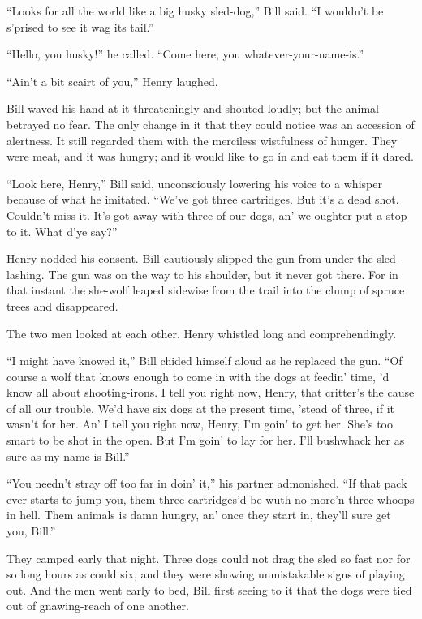 \documentclass[10pt]{book}
\begin{document}
“Looks for all the world like a big husky sled-dog,” Bill said. “I
wouldn’t be s’prised to see it wag its tail.”

“Hello, you husky!” he called. “Come here, you whatever-your-name-is.”

“Ain’t a bit scairt of you,” Henry laughed.

Bill waved his hand at it threateningly and shouted loudly; but the
animal betrayed no fear. The only change in it that they could notice
was an accession of alertness. It still regarded them with the
merciless wistfulness of hunger. They were meat, and it was hungry; and
it would like to go in and eat them if it dared.

“Look here, Henry,” Bill said, unconsciously lowering his voice to a
whisper because of what he imitated. “We’ve got three cartridges. But
it’s a dead shot. Couldn’t miss it. It’s got away with three of our
dogs, an’ we oughter put a stop to it. What d’ye say?”

Henry nodded his consent. Bill cautiously slipped the gun from under
the sled-lashing. The gun was on the way to his shoulder, but it never
got there. For in that instant the she-wolf leaped sidewise from the
trail into the clump of spruce trees and disappeared.

The two men looked at each other. Henry whistled long and
comprehendingly.

“I might have knowed it,” Bill chided himself aloud as he replaced the
gun. “Of course a wolf that knows enough to come in with the dogs at
feedin’ time, ’d know all about shooting-irons. I tell you right now,
Henry, that critter’s the cause of all our trouble. We’d have six dogs
at the present time, ’stead of three, if it wasn’t for her. An’ I tell
you right now, Henry, I’m goin’ to get her. She’s too smart to be shot
in the open. But I’m goin’ to lay for her. I’ll bushwhack her as sure
as my name is Bill.”

“You needn’t stray off too far in doin’ it,” his partner admonished.
“If that pack ever starts to jump you, them three cartridges’d be wuth
no more’n three whoops in hell. Them animals is damn hungry, an’ once
they start in, they’ll sure get you, Bill.”

They camped early that night. Three dogs could not drag the sled so
fast nor for so long hours as could six, and they were showing
unmistakable signs of playing out. And the men went early to bed, Bill
first seeing to it that the dogs were tied out of gnawing-reach of one
another.
\end{document}
